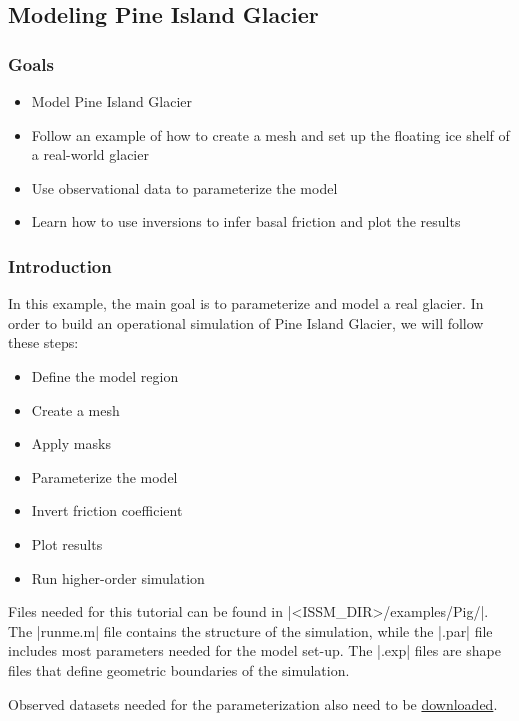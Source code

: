 
\subsection{Modeling Pine Island Glacier} \label{sec:using-issm-tutorials-pig}
\subsubsection{Goals} %
\begin{itemize}
	\item Model Pine Island Glacier
	\item Follow an example of how to create a mesh and set up the floating ice shelf of a real-world glacier
	\item Use observational data to parameterize the model
	\item Learn how to use inversions to infer basal friction and plot the results
\end{itemize}

\subsubsection{Introduction}%
In this example, the main goal is to parameterize and model a real glacier. In order to build an operational simulation of Pine Island Glacier, we will follow these steps:
\begin{itemize}
	\item Define the model region
	\item Create a mesh
	\item Apply masks
	\item Parameterize the model
	\item Invert friction coefficient
	\item Plot results
	\item Run higher-order simulation
\end{itemize}

Files needed for this tutorial can be found in \lstinlinebg|<ISSM_DIR>/examples/Pig/|. The \lstinlinebg|runme.m| file contains the structure of the simulation, while the \lstinlinebg|.par| file includes most parameters needed for the model set-up. The \lstinlinebg|.exp| files are shape files that define geometric boundaries of the simulation.

Observed datasets needed for the parameterization also need to be 
\hyperref[sec:using-issm-tutorials-datasets]{downloaded}.
